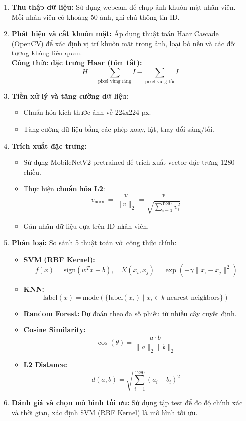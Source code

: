 \documentclass[a4paper]{book}
\begin{document}
\begin{enumerate}
    \item \textbf{Thu thập dữ liệu:} Sử dụng webcam để chụp ảnh khuôn mặt nhân viên. Mỗi nhân viên có khoảng 50 ảnh, ghi chú thông tin ID.
    
    \item \textbf{Phát hiện và cắt khuôn mặt:} Áp dụng thuật toán Haar Cascade (OpenCV) để xác định vị trí khuôn mặt trong ảnh, loại bỏ nền và các đối tượng không liên quan.\\
    \textbf{Công thức đặc trưng Haar (tóm tắt):}
    \[
    H = \sum_{\text{pixel vùng sáng}} I - \sum_{\text{pixel vùng tối}} I
    \]
    
    \item \textbf{Tiền xử lý và tăng cường dữ liệu:} 
    \begin{itemize}
        \item Chuẩn hóa kích thước ảnh về 224x224 px.
        \item Tăng cường dữ liệu bằng các phép xoay, lật, thay đổi sáng/tối.
    \end{itemize}
    
    \item \textbf{Trích xuất đặc trưng:} 
    \begin{itemize}
        \item Sử dụng MobileNetV2 pretrained để trích xuất vector đặc trưng 1280 chiều.
        \item Thực hiện \textbf{chuẩn hóa L2}:
        \[
        v_{\text{norm}} = \frac{v}{\|v\|_2} = \frac{v}{\sqrt{\sum_{i=1}^{1280} v_i^2}}
        \]
        \item Gán nhãn dữ liệu dựa trên ID nhân viên.
    \end{itemize}

    \item \textbf{Phân loại:} So sánh 5 thuật toán với công thức chính:
    \begin{itemize}
        \item \textbf{SVM (RBF Kernel):} 
        \[
        f(x) = \text{sign}(w^T x + b), \quad 
        K(x_i, x_j) = \exp(-\gamma \|x_i - x_j\|^2)
        \]
        \item \textbf{KNN:} 
        \[
        \text{label}(x) = \text{mode}(\{ \text{label}(x_i) \mid x_i \in k\text{ nearest neighbors} \})
        \]
        \item \textbf{Random Forest:} Dự đoán theo đa số phiếu từ nhiều cây quyết định.
        \item \textbf{Cosine Similarity:} 
        \[
        \cos(\theta) = \frac{a \cdot b}{\|a\|_2 \|b\|_2}
        \]
        \item \textbf{L2 Distance:} 
        \[
        d(a, b) = \sqrt{\sum_{i=1}^{1280} (a_i - b_i)^2}
        \]
    \end{itemize}
    
    \item \textbf{Đánh giá và chọn mô hình tối ưu:} Sử dụng tập test để đo độ chính xác và thời gian, xác định SVM (RBF Kernel) là mô hình tối ưu.
\end{enumerate}
\end{document}
